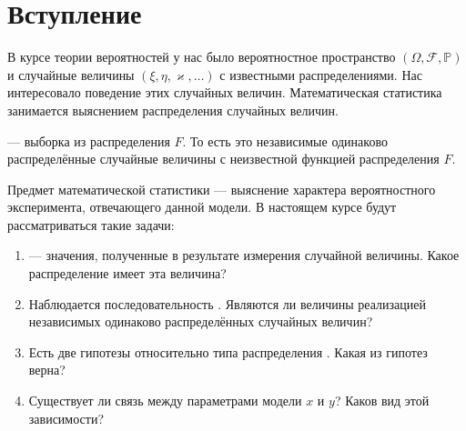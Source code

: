 \chapter*{Вступление}

В курсе теории вероятностей у нас было вероятностное пространство
$\left( \Omega, \mathcal{F}, \mathbb{P} \right)$ и случайные величины
$\left( \xi, \eta, \varkappa, \dots \right)$ с известными распределениями.
Нас интересовало поведение этих случайных величин.
Математическая статистика занимается выяснением распределения случайных величин.

\xsample --- выборка из распределения $F$. То есть это независимые
одинаково распределённые случайные величины с неизвестной функцией распределения
$F$.

Предмет математической статистики --- выяснение характера вероятностного
эксперимента, отвечающего данной модели.
В настоящем курсе будут рассматриваться такие задачи:
\begin{enumerate}
  \item
    \xsample --- значения, полученные в результате измерения случайной
    величины.
    Какое распределение имеет эта величина?
  \item
    Наблюдается последовательность \xsample.
    Являются ли величины \xsample реализацией независимых
    одинаково распределённых случайных величин?
  \item
    Есть две гипотезы относительно типа распределения \xsample.
    Какая из гипотез верна?
  \item
    Существует ли связь между параметрами модели $x$ и $y$?
    Каков вид этой зависимости?
\end{enumerate}

